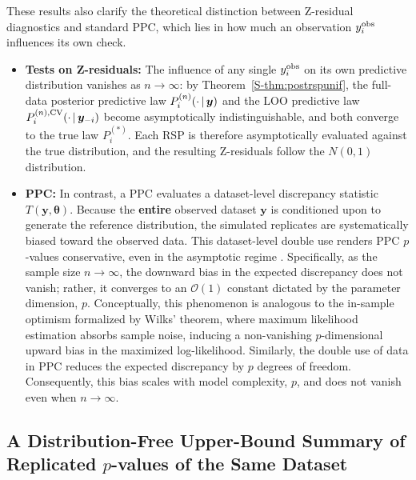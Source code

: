 These results also clarify the theoretical distinction between Z-residual
diagnostics and standard PPC, which lies in how much an
observation $y_i^{\text{obs}}$ influences its own check.

\begin{itemize}
\item \textbf{Tests on Z-residuals:}
The influence of any single $y_i^{\text{obs}}$ on its own predictive distribution
vanishes as $n\to\infty$: by Theorem~\ref{S-thm:postrspunif}, the full-data
posterior predictive law $P_i^{(n)}(\cdot\,|\,\bm{y})$ and the LOO predictive
law $P_i^{(n),\text{CV}}(\cdot\,|\,\bm{y}_{-i})$ become asymptotically
indistinguishable, and both converge to the true law $P_i^{(*)}$. Each RSP
is therefore asymptotically evaluated against the true distribution, and
the resulting Z-residuals follow the $N(0,1)$ distribution.

\item \textbf{PPC:} In contrast, a PPC evaluates a dataset-level discrepancy statistic $T(\mathbf{y}, \boldsymbol{\theta})$. Because the \textbf{entire} observed dataset $\mathbf{y}$ is conditioned upon to generate the reference distribution, the simulated replicates are systematically biased toward the observed data. This dataset-level double use renders PPC $p$-values conservative, even in the asymptotic regime \citep{Robins2000}. Specifically, as the sample size $n \to \infty$, the downward bias in the expected discrepancy does not vanish; rather, it converges to an $\mathcal{O}(1)$ constant dictated by the parameter dimension, $p$. Conceptually, this phenomenon is analogous to the in-sample optimism formalized by Wilks' theorem, where maximum likelihood estimation absorbs sample noise, inducing a non-vanishing $p$-dimensional upward bias in the maximized log-likelihood. Similarly, the double use of data in PPC reduces the expected discrepancy by $p$ degrees of freedom. Consequently, this bias scales with model complexity, $p$, and does not vanish even when $n \to \infty$.

\end{itemize}

\subsection{A Distribution-Free Upper-Bound Summary of Replicated $p$-values of the Same Dataset}\label{upper_bound}

